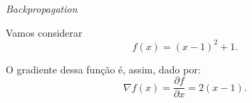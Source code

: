 \begin{frame}{\textit{Backpropagation} \cont}

    \begin{example}
        
        \medskip
        
        Vamos considerar 
        \begin{equation}
            f(x) = (x - 1)^2 + 1.
        \end{equation} 
        
        \medskip
        
        O gradiente dessa função é, assim, dado por:
        \begin{equation}
            \nabla f(x) = \dfrac{\partial f}{\partial x} = 2 (x-1).
        \end{equation}
        
        \begin{figure}
            \centering
            \resizebox{0.4\textwidth}{!}{
                
            }
        \end{figure}
        
    \end{example}

\end{frame}

